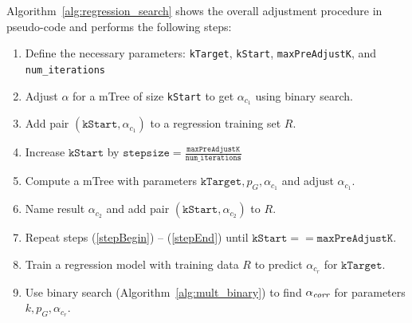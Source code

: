 Algorithm~\ref{alg:regression_search} shows the overall adjustment procedure in pseudo-code and performs the following steps:
%
\begin{enumerate}
	\item Define the necessary parameters: \texttt{kTarget}, \texttt{kStart}, \texttt{maxPreAdjustK}, and \texttt{num\_iterations}
	\item Adjust $\alpha$ for a mTree of size \texttt{kStart} to get $\alpha_{c_1}$ using binary search.
	\item Add pair $\left(\texttt{kStart}, \alpha_{c_1}\right)$ to a regression training set $R$.
	\item \label{stepBegin} Increase $\texttt{kStart}$ by $\texttt{stepsize}=\frac{\texttt{maxPreAdjustK}}{\texttt{num\_iterations}}$
	\item Compute a mTree with parameters $\texttt{kTarget}, p_G, \alpha_{c_1}$ and adjust $\alpha_{c_1}$.
	\item \label{stepEnd} Name result $\alpha_{c_2}$ and add pair $\left(\texttt{kStart}, \alpha_{c_2}\right)$ to $R$.
	\item Repeat steps (\ref{stepBegin}) -- (\ref{stepEnd}) until $\texttt{kStart} == \texttt{maxPreAdjustK}$.
	\item Train a regression model with training data $R$ to predict $\alpha_{c_r}$ for $\texttt{kTarget}$.
	\item Use binary search (Algorithm~\ref{alg:mult_binary}) to find $\alpha_\textit{corr}$ for parameters $k,p_G, \alpha_{c_r}$.
\end{enumerate}
